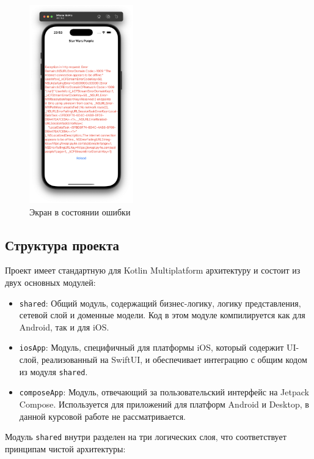 \documentclass[14pt, russian]{scrartcl}
\begin{document}
\begin{figure}[!htb]
    \centering
    \includegraphics[width=0.4\textwidth]{ios_error.png}
    \caption{Экран в состоянии ошибки}
    \label{fig:error_screen}
\end{figure}

\subsection{Структура проекта}

Проект имеет стандартную для Kotlin Multiplatform архитектуру и состоит из двух основных модулей:

\begin{itemize}
    \item \texttt{shared}: Общий модуль, содержащий бизнес-логику, логику представления, сетевой слой и доменные модели. Код в этом модуле компилируется как для Android, так и для iOS.
    \item \texttt{iosApp}: Модуль, специфичный для платформы iOS, который содержит UI-слой, реализованный на SwiftUI, и обеспечивает интеграцию с общим кодом из модуля \texttt{shared}.
    \item \texttt{composeApp}: Модуль, отвечающий за пользовательский интерфейс на Jetpack Compose. Используется для приложений для платформ Android и Desktop, в данной курсовой работе не рассматривается.
\end{itemize}

Модуль \texttt{shared} внутри разделен на три логических слоя, что соответствует принципам чистой архитектуры:
\end{document}
